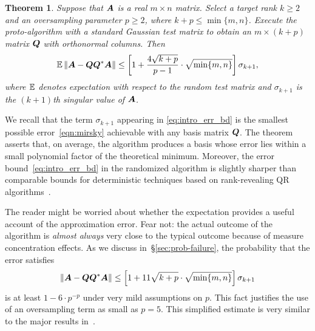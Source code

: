 \documentclass{article}
\newtheorem{theorem}{Theorem}
\begin{document}
\begin{theorem} %
Suppose that $\bm{A}$ is a real $m \times n$ matrix.  Select
a target rank $k \geq 2$ and an oversampling parameter $p \geq 2$,
where $k + p \leq \min\{m,n\}$.
Execute the proto-algorithm with
a standard Gaussian test matrix to obtain an
$m \times (k + p)$ matrix $\bm{Q}$ with orthonormal columns.  Then
\begin{equation}
\label{eq:intro_err_bd}
\operatorname{\mathbb{E}} \left\Vert { \bm{A} - \bm{QQ}^*\bm{A} } \right\Vert
    \leq \left[ 1 + \frac{4 \sqrt{k+p}}{p-1} \cdot\sqrt{\min\{m,n\}} \right] \sigma_{k+1},
\end{equation}
where $\operatorname{\mathbb{E}}$ denotes expectation with respect to the
random test matrix and $\sigma_{k+1}$ is the $(k+1)$th
singular value of $\bm{A}$.
\end{theorem}

\lsp

We recall that the term $\sigma_{k+1}$ appearing in \eqref{eq:intro_err_bd}
is the smallest possible error~\eqref{eqn:mirsky} achievable with any basis
matrix $\bm{Q}$. The theorem asserts that, on average,
the algorithm produces a basis whose error lies within a small
polynomial factor of the theoretical minimum.
Moreover, the error bound~\eqref{eq:intro_err_bd} in the randomized
algorithm is slightly sharper than comparable bounds for
deterministic techniques based on rank-revealing QR algorithms~\cite{gu_rrqr}.

The reader might be worried about whether the expectation provides a
useful account of the approximation error.  Fear not: the actual outcome
of the algorithm is {\em almost always} very close to
the typical outcome because of measure
concentration effects.  As we discuss in~\S\ref{sec:prob-failure},
the probability that the error satisfies
\begin{equation} \label{eq:intro_err_prob}
\left\Vert { \bm{A} - \bm{QQ}^*\bm{A} } \right\Vert
    \leq \left[ 1 + 11 \sqrt{k+p} \cdot\sqrt{\min\{m,n\}} \right] \sigma_{k+1}
\end{equation}
is at least $1 - 6 \cdot p^{-p}$ under very mild assumptions on $p$.
This fact justifies the use of an oversampling term as small as $p = 5$.
This simplified estimate is very similar to the major results in~\cite{random1}.
\end{document}
